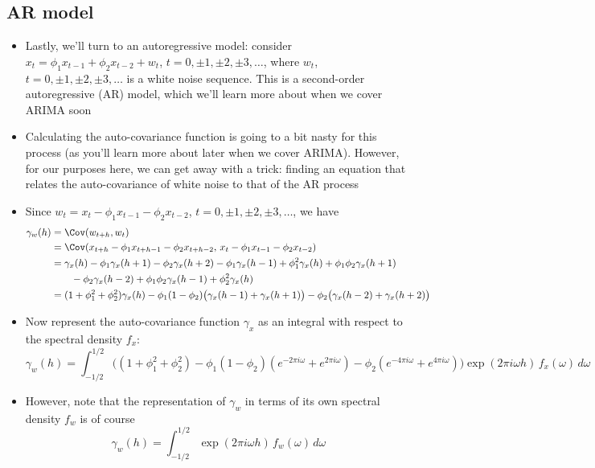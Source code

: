 \documentclass{article}
\begin{document}
\subsection{AR model}

\begin{itemize}
\item Lastly, we'll turn to an autoregressive model: consider $x_t = \phi_1
  x_{t-1} + \phi_2 x_{t-2} + w_t$, $t = 0, \pm 1, \pm 2, \pm 3, \dots$, where
  $w_t$, $t = 0, \pm 1, \pm 2, \pm 3, \dots$ is a white noise sequence. This is
  a second-order autoregressive (AR) model, which we'll learn more about when we
  cover ARIMA soon 

\item Calculating the auto-covariance function is going to a bit nasty for this 
  process (as you'll learn more about later when we cover ARIMA). However, for
  our purposes here, we can get away with a trick: finding an equation that
  relates the auto-covariance of white noise to that of the AR process 

\item Since $w_t = x_t - \phi_1 x_{t-1} - \phi_2 x_{t-2}$, $t = 0, \pm 1, \pm 2,
  \pm 3, \dots$, we have 
  \begin{align*}
  \gamma_w(h) &= \Cov(w_{t+h}, w_t) \\
  &= \Cov(x_{t+h} - \phi_1 x_{t+h-1} -  \phi_2 x_{t+h-2}, \,
    x_t - \phi_1 x_{t-1} - \phi_2 x_{t-2}) \\
  &= \gamma_x(h) - \phi_1 \gamma_x(h+1) - \phi_2 \gamma_x(h+2) 
    - \phi_1 \gamma_x(h-1) + \phi_1^2 \gamma_x(h) + \phi_1 \phi_2 
    \gamma_x(h+1) \\ 
    &\qquad - \phi_2 \gamma_x(h-2) +  \phi_1 \phi_2 \gamma_x(h-1) + \phi_2^2
    \gamma_x(h) \\
    &= (1+\phi_1^2+\phi_2^2) \gamma_x(h)  
      -\phi_1(1-\phi_2) \big( \gamma_x(h-1) + \gamma_x(h+1) \big) 
      - \phi_2 \big( \gamma_x(h-2) + \gamma_x(h+2) \big)  
  \end{align*}

\item Now represent the auto-covariance function $\gamma_x$ as an integral with
  respect to the spectral density $f_x$:
  \[
  \gamma_w(h) = \int_{-1/2}^{1/2} \Big( (1+\phi_1^2+\phi_2^2)  
  - \phi_1(1-\phi_2) (e^{-2\pi i \omega} + e^{2\pi i \omega})
  - \phi_2 (e^{-4\pi i \omega} + e^{4\pi i \omega}) \Big) \exp(2\pi i \omega
  h) \, f_x(\omega) \, d\omega
  \]

\item However, note that the representation of $\gamma_w$ in terms of its own
  spectral density $f_w$ is of course
  \[
  \gamma_w(h) = \int_{-1/2}^{1/2} \exp(2\pi i \omega h) \, f_w(\omega) \,
  d\omega 
  \]


\end{itemize}
\end{document}
